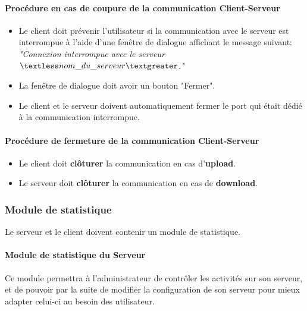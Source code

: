 \documentclass[10pt,a4paper]{report}
\begin{document}
\paragraph{\textbf{Procédure en cas de coupure de la communication Client-Serveur}}

\begin{itemize}[label = $\triangleright$]
\item Le client doit prévenir l'utilisateur si la communication avec le serveur est interrompue à l'aide d'une fenêtre de dialogue affichant le message suivant:\\
\textit{"Connexion interrompue avec le serveur $\textless nom\_du\_serveur\textgreater$."}

\item La fenêtre de dialogue doit avoir un bouton "Fermer".

\item Le client et le serveur doivent automatiquement fermer le port qui était dédié à la communication interrompue.
\end{itemize}


\paragraph{\textbf{Procédure de fermeture de la communication Client-Serveur}}

\begin{itemize}[label = $\triangleright$]
\item Le client doit \textbf{clôturer} la communication en cas d'\textbf{upload}.

\item Le serveur doit \textbf{clôturer} la communication en cas de \textbf{download}. 
\end{itemize}

\subsubsection{Module de statistique}

Le serveur et le client doivent contenir un module de statistique.


\paragraph{\textbf{Module de statistique du Serveur\\}}

Ce module permettra à l'administrateur de contrôler les activités sur son serveur, et de pouvoir par la suite de modifier la configuration de son serveur pour mieux adapter celui-ci au besoin des utilisateur.
\end{document}
